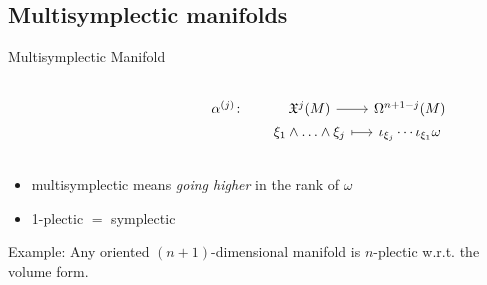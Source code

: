 \documentclass[beamer,10pt]{standalone}
\begin{document}


  \subsection{Multisymplectic manifolds}
  \begin{frame}[fragile]{Multisymplectic Manifold} %
			\begin{defblock}
				
			\end{defblock}

			\begin{defblock}
				\begin{columns}
					\hfill
					\begin{column}{.4\linewidth}
					\end{column}
					\begin{column}{.6\linewidth}
						\[
						\begin{tikzcd}[column sep= small,row sep=0ex]
						    \alpha^{(j)} \colon& \mathfrak{X}^j(M) 	\arrow[r]& 				\Omega^{n+1-j}(M) \\
						  						& \xi_1\wedge\ldots\wedge\xi_j 						\arrow[r, mapsto]& 	\iota_{\xi_j}\cdots\iota_{\xi_1} \omega 					
						\end{tikzcd}	
						\]
					\end{column}
				\end{columns}
			\end{defblock}

			\begin{itemize}
					\item multisymplectic means \emph{going higher} in the rank of $\omega$\pause
					\item 1-plectic $=$ symplectic
			\end{itemize}
			\vspace{1ex}
			\pause
			\begin{block}{Example:}
				Any oriented $(n+1)$-dimensional manifold is $n$-plectic w.r.t. the volume form.
			\end{block}			 


  \end{frame}
\end{document}
